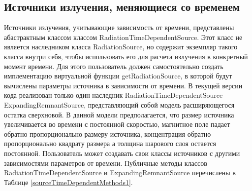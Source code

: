 \subsection{Источники излучения, меняющиеся со временем}\label{timeDependentSource}
Источники излучения, учитывающие зависимость от времени, представлены абастрактным классом классом RadiationTimeDependentSource. Этот класс не является наследником класса RadiationSource, но содержит экземпляр такого класса внутри себя, чтобы использовать его для расчета излучения в конкретный момент времени. Для этого пользователь должен самостоятельно создать имплементацию виртуальной функции getRadiationSource, в которой будут вычислены параметры источника в зависимости от времени.  В текущей версии кода реализован только один наследник RadiationTimeDependentSource - ExpandingRemnantSource, представляющий собой модель расширяющегося остатка сверхновой. В данной модели предполагается, что размер источника увеличивается во времени с постоянной скоростью, магнитное поле падает обратно пропорционально размеру источника, концентрация обратно пропорционально квадрату размера а толщина шарового слоя остается постоянной. Пользователь может создавать свои классы источников с другими зависимостями параметров от времени. Публичные методы классов RadiationTimeDependentSource и ExpandingRemnantSource перечислены  в Таблице \ref{sourceTimeDependentMethods1}.

